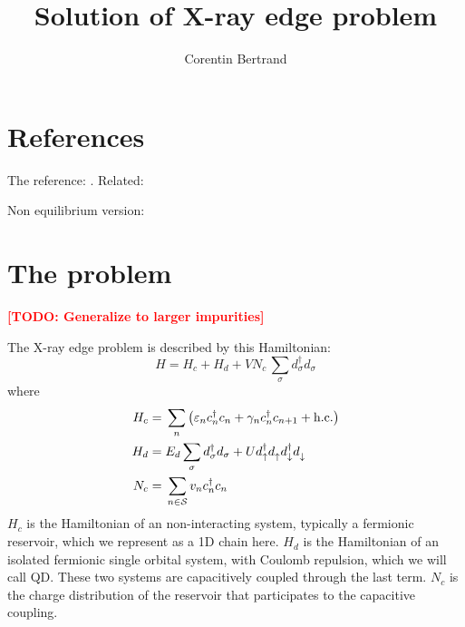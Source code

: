 \documentclass[12pt]{article}
\newcommand\TODO[1]{\textcolor{red}{\textbf{[TODO: #1]}}}
\newcommand\up{\uparrow}
\newcommand\dn{\downarrow}
\newcommand\nodag{{\vphantom{\dagger}}}
\begin{document}
\title{Solution of X-ray edge problem}
\author{Corentin Bertrand}

\maketitle




\begin{acronym}
\end{acronym}

\section{References}

The reference: \cite{NozieresDeDominicis1969}. Related: \cite{Roulet1969, NozieresRoulet1969}

Non equilibrium version: \cite{Aleiner1997}

\section{The problem}

\TODO{Generalize to larger impurities}

The X-ray edge problem is described by this Hamiltonian:
\begin{equation}
	H = H_c + H_d + V N_c \, \sum_{\sigma} d_\sigma^\dagger d_\sigma
\end{equation}
where
\begin{align}
	H_c ={}& \sum_n \qty( \varepsilon_n c_n^\dagger c_n + \gamma_n c_n^\dagger c_{n+1} + \text{h.c.})
	\\
	H_d ={}& E_d \sum_{\sigma} d_\sigma^\dagger d_\sigma + U d_\up^\dag d_\up^\nodag d_\dn^\dag d_\dn^\nodag
	\\
	N_c ={}& \sum_{n \in \mathcal{S}} v_n c_n^\dag c_n
\end{align}
$H_c$ is the Hamiltonian of an non-interacting system, typically a fermionic reservoir, which we represent as a 1D chain here. $H_d$ is the Hamiltonian of an isolated fermionic single orbital system, with Coulomb repulsion, which we will call \ac{QD}. These two systems are capacitively coupled through the last term. $N_c$ is the charge distribution of the reservoir that participates to the capacitive coupling.
\end{document}
